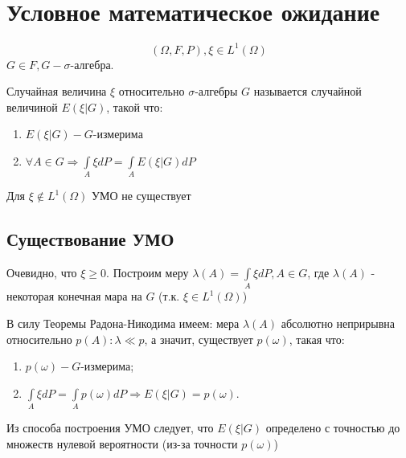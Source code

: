 \section{Условное математическое ожидание}
$$(\Omega, F, P), \xi \in L^1(\Omega)$$
$G \in F, G - \sigma$-алгебра.
\begin{definition}
Случайная величина $\xi$ относительно $\sigma$-алгебры $G$ называется случайной величиной $E(\xi | G)$, такой что:
\begin{enumerate}
\item $E(\xi | G) - G$-измерима
\item $\forall A \in G \Rightarrow \int\limits_A \xi dP = \int\limits_A E(\xi | G) dP$
\end{enumerate}
\end{definition}
\begin{remark}
 Для $\xi \notin L^1(\Omega)$ УМО не существует
\end{remark}
\subsection{Существование УМО}
Очевидно, что $\xi \geqslant 0$. Построим меру $\lambda(A) = \int\limits_A \xi dP, A \in G$, где $\lambda(A)$ - некоторая конечная мара на $G$ (т.к. $\xi \in L^1(\Omega)$)

В силу Теоремы Радона-Никодима имеем: мера $\lambda(A)$ абсолютно неприрывна относительно $p(A) : \lambda\ll p$, а значит, существует $p(\omega)$, такая что:
\begin{enumerate}
\item $p(\omega) - G$-измерима;
\item $\int\limits_A \xi dP = \int\limits_A p(\omega)dP \Rightarrow E(\xi | G)  = p(\omega)$.
\end{enumerate}
\begin{remark}
Из способа построения УМО следует, что $E(\xi | G)$ определено с точностью до множеств нулевой вероятности (из-за точности $p(\omega)$)
\end{remark}
